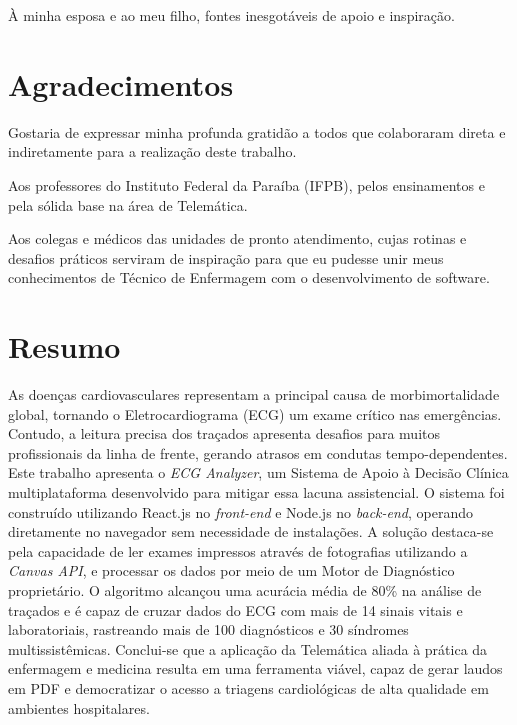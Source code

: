 \documentclass[portuguese,12pt,oneside,a4paper]{book}
\begin{document}
\newpage
\thispagestyle{empty}
        \vspace*{20.0cm}
        \begin{flushright}
            À minha esposa e ao meu filho, fontes inesgotáveis de apoio e inspiração.
        \end{flushright}

\pagebreak

\chapter*{Agradecimentos}

Gostaria de expressar minha profunda gratidão a todos que colaboraram direta e indiretamente para a realização deste trabalho. 

Aos professores do Instituto Federal da Paraíba (IFPB), pelos ensinamentos e pela sólida base na área de Telemática. 

Aos colegas e médicos das unidades de pronto atendimento, cujas rotinas e desafios práticos serviram de inspiração para que eu pudesse unir meus conhecimentos de Técnico de Enfermagem com o desenvolvimento de software.

\pagebreak


\chapter*{Resumo}
As doenças cardiovasculares representam a principal causa de morbimortalidade global, tornando o Eletrocardiograma (ECG) um exame crítico nas emergências. Contudo, a leitura precisa dos traçados apresenta desafios para muitos profissionais da linha de frente, gerando atrasos em condutas tempo-dependentes. Este trabalho apresenta o \textit{ECG Analyzer}, um Sistema de Apoio à Decisão Clínica multiplataforma desenvolvido para mitigar essa lacuna assistencial. O sistema foi construído utilizando React.js no \textit{front-end} e Node.js no \textit{back-end}, operando diretamente no navegador sem necessidade de instalações. A solução destaca-se pela capacidade de ler exames impressos através de fotografias utilizando a \textit{Canvas API}, e processar os dados por meio de um Motor de Diagnóstico proprietário. O algoritmo alcançou uma acurácia média de 80\% na análise de traçados e é capaz de cruzar dados do ECG com mais de 14 sinais vitais e laboratoriais, rastreando mais de 100 diagnósticos e 30 síndromes multissistêmicas. Conclui-se que a aplicação da Telemática aliada à prática da enfermagem e medicina resulta em uma ferramenta viável, capaz de gerar laudos em PDF e democratizar o acesso a triagens cardiológicas de alta qualidade em ambientes hospitalares.
\end{document}
